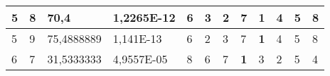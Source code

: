 \documentclass[conference]{IEEEtran}
\begin{document}
\begin{table*}[]
\begin{tabular}{|llll|llllllll|}
\multicolumn{1}{|l|}{5}                                                     & \multicolumn{1}{l|}{8}                                                        & \multicolumn{1}{l|}{70,4}                                                         & 1,2265E-12                     & \multicolumn{1}{l|}{6}                                                  & \multicolumn{1}{l|}{3}                                                  & \multicolumn{1}{l|}{2}                                                  & \multicolumn{1}{l|}{7}                                                  & \multicolumn{1}{l|}{\textbf{1}}                                         & \multicolumn{1}{l|}{4}                                                  & \multicolumn{1}{l|}{5}                                                  & 8                          \\ \hline
\multicolumn{1}{|l|}{5}                                                     & \multicolumn{1}{l|}{9}                                                        & \multicolumn{1}{l|}{75,4888889}                                                   & 1,141E-13                      & \multicolumn{1}{l|}{6}                                                  & \multicolumn{1}{l|}{2}                                                  & \multicolumn{1}{l|}{3}                                                  & \multicolumn{1}{l|}{7}                                                  & \multicolumn{1}{l|}{\textbf{1}}                                         & \multicolumn{1}{l|}{4}                                                  & \multicolumn{1}{l|}{5}                                                  & 8                          \\ \hline
\multicolumn{1}{|l|}{6}                                                     & \multicolumn{1}{l|}{7}                                                        & \multicolumn{1}{l|}{31,5333333}                                                   & 4,9557E-05                     & \multicolumn{1}{l|}{8}                                                  & \multicolumn{1}{l|}{6}                                                  & \multicolumn{1}{l|}{7}                                                  & \multicolumn{1}{l|}{\textbf{1}}                                         & \multicolumn{1}{l|}{3}                                                  & \multicolumn{1}{l|}{2}                                                  & \multicolumn{1}{l|}{5}                                                  & 4                          \\ \hline

\end{tabular}
\end{table*}
\end{document}
